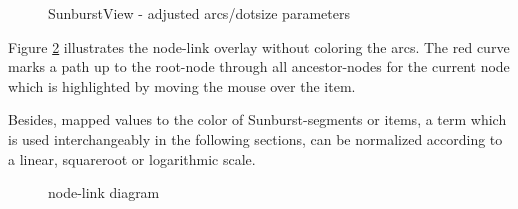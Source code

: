 \begin{itemize}
\begin{figure}[tb]
\caption{\label{fig:sunburst-adjusted-scale} SunburstView - adjusted arcs/dotsize parameters}
\end{figure}

Figure \ref{fig:nodelink} illustrates the node-link overlay without coloring the arcs. The red curve marks a path up to the root-node through all ancestor-nodes for the current node which is highlighted by moving the mouse over the item.

Besides, mapped values to the color of Sunburst-segments or items, a term which is used interchangeably in the following sections, can be normalized according to a linear, squareroot or logarithmic scale.

\begin{figure}[tb]
\caption{\label{fig:nodelink} node-link diagram}
\end{figure}


\end{itemize}
